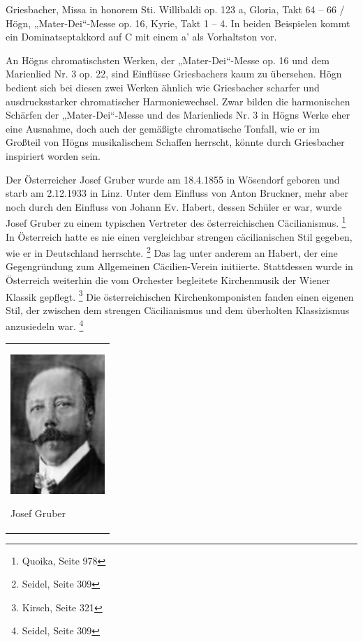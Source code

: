 Griesbacher, Missa in honorem Sti.
Willibaldi op. 123 a, Gloria, Takt 64 – 66 / Högn, „Mater-Dei“-Messe
op. 16, Kyrie, Takt 1 – 4. In beiden Beispielen kommt ein
Dominatseptakkord auf C mit einem a’ als Vorhaltston vor.

An Högns chromatischsten Werken, der „Mater-Dei“-Messe op. 16 und dem
Marienlied Nr. 3 op. 22, sind Einflüsse Griesbachers kaum zu übersehen.
Högn bedient sich bei diesen zwei Werken ähnlich wie Griesbacher
scharfer und ausdrucksstarker chromatischer Harmoniewechsel. Zwar
bilden die harmonischen Schärfen der „Mater-Dei“-Messe und des
Marienlieds Nr. 3 in Högns Werke eher eine Ausnahme, doch auch der
gemäßigte chromatische Tonfall, wie er im Großteil von Högns
musikalischem Schaffen herrscht, könnte durch Griesbacher inspiriert
worden sein.

Der Österreicher Josef Gruber wurde am 18.4.1855 in Wösendorf geboren
und starb am 2.12.1933 in Linz. Unter dem Einfluss von Anton Bruckner,
mehr aber noch durch den Einfluss von Johann Ev. Habert, dessen Schüler
er war, wurde Josef Gruber zu einem typischen Vertreter des
österreichischen Cäcilianismus. \footnote{Quoika, Seite 978} In
Österreich hatte es nie einen vergleichbar strengen cäcilianischen Stil
gegeben, wie er in Deutschland herrschte. \footnote{Seidel, Seite 309}
Das lag unter anderem an Habert, der eine Gegengründung zum Allgemeinen
Cäcilien-Verein initiierte. Stattdessen wurde in Österreich weiterhin
die vom Orchester begleitete Kirchenmusik der Wiener Klassik
gepflegt. \footnote{Kirsch, Seite 321} Die österreichischen
Kirchenkomponisten fanden einen eigenen Stil, der zwischen dem strengen
Cäcilianismus und dem überholten Klassizismus anzusiedeln
war. \footnote{Seidel, Seite 309}

\begin{center}
\begin{minipage}{3.953cm}
\begin{flushleft}
\tablefirsthead{}
\tablehead{}
\tabletail{}
\tablelasttail{}
\begin{supertabular}{m{3.753cm}}

\includegraphics[width=3.57cm,height=5.276cm]{pictures/zulassungsarbeit-img093.jpg}

Josef Gruber\\
\end{supertabular}
\end{flushleft}
\end{minipage}
\end{center}


